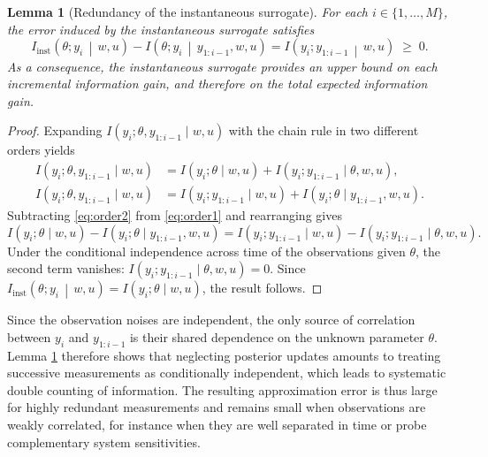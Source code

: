 \documentclass[a4paper,11pt]{article}
\newtheorem{lemma}{Lemma}
\begin{document}
\begin{lemma}[Redundancy of the instantaneous surrogate]
For each $i \in \{1,\dots,M\}$, the error induced by the instantaneous surrogate satisfies \label{lmm:redundancy}
\begin{equation}
  I_{\mathrm{inst}}\!\left(\theta; y_i \,\middle|\, w,u\right)
  -
  I\!\left(\theta; y_i \,\middle|\, y_{1:i-1},w,u\right)
  =
  I\!\left(y_i; y_{1:i-1} \,\middle|\, w,u\right)
  \;\ge\; 0.
\end{equation}
As a consequence, the instantaneous surrogate provides an upper bound on each
incremental information gain, and therefore on the total expected information gain.
\end{lemma}
\begin{proof}
Expanding $I\!\left(y_i;\theta, y_{1:i-1}\mid w,u\right)$ with the chain rule in two different orders yields 
\begin{align}
I\!\left(y_i;\theta, y_{1:i-1}\mid w,u\right)
&= I\!\left(y_i;\theta\mid w,u\right) + I\!\left(y_i; y_{1:i-1}\mid \theta,w,u\right), \label{eq:order1}\\
I\!\left(y_i;\theta, y_{1:i-1}\mid w,u\right)
&= I\!\left(y_i; y_{1:i-1}\mid w,u\right) + I\!\left(y_i;\theta\mid y_{1:i-1},w,u\right). \label{eq:order2}
\end{align}
Subtracting \eqref{eq:order2} from \eqref{eq:order1} and rearranging gives
\[
I\!\left(y_i;\theta\mid w,u\right) - I\!\left(y_i;\theta\mid y_{1:i-1},w,u\right)
=
I\!\left(y_i; y_{1:i-1}\mid w,u\right) - I\!\left(y_i; y_{1:i-1}\mid \theta,w,u\right).
\]
Under the conditional independence across time of the observations given $\theta$,
the second term vanishes:
\(
I(y_i; y_{1:i-1} \mid \theta,w,u)=0.
\)
Since $I_{\mathrm{inst}}\!\left(\theta; y_i \,\middle|\, w,u\right) = I\!\left(y_i;\theta\mid w,u\right)$, the result follows.
\end{proof}
Since the observation noises are independent, the only source of correlation
between \(y_i\) and \(y_{1:i-1}\) is their shared dependence on the unknown parameter
\(\theta\).
Lemma \ref{lmm:redundancy} therefore shows that neglecting posterior updates amounts to treating successive
measurements as conditionally independent, which leads to systematic double
counting of information.
The resulting approximation error is thus large for highly redundant measurements
and remains small when observations are weakly correlated, for instance when
they are well separated in time or probe complementary system sensitivities.
\end{document}
